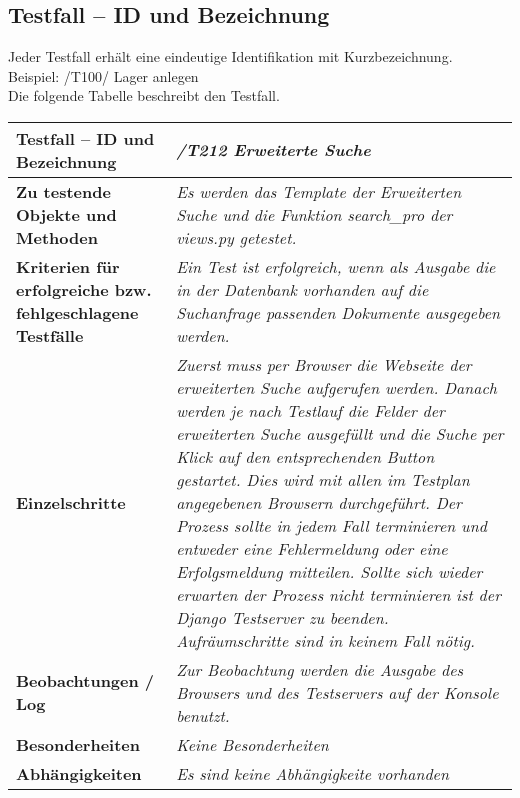 \subsection{Testfall -- ID und Bezeichnung}
Jeder Testfall erh\"alt eine eindeutige Identifikation mit Kurzbezeichnung.\\
Beispiel: /T100/ Lager anlegen\\
Die folgende Tabelle beschreibt den Testfall. \\
\begin{longtable}{|p{5cm}|p{10cm}|}
\hline
\textbf{Testfall -- ID und Bezeichnung} &  \textit{/T212 Erweiterte Suche} \\
\hline
\textbf{Zu testende Objekte und Methoden} &  \textit{Es werden das Template der
Erweiterten Suche und die Funktion search\_pro der views.py getestet.}
\\
\hline
\textbf{Kriterien f\"ur erfolgreiche bzw. fehlgeschlagene Testf\"alle} &
\textit{Ein Test ist erfolgreich, wenn als Ausgabe die in der Datenbank
vorhanden auf die Suchanfrage passenden Dokumente ausgegeben werden.} \\
\hline
\textbf{Einzelschritte} &  \textit{Zuerst muss per Browser die Webseite  
der erweiterten Suche aufgerufen werden. Danach werden je nach Testlauf die 
Felder der erweiterten Suche ausgefüllt und die Suche per Klick auf den 
entsprechenden Button gestartet. Dies wird mit allen im Testplan angegebenen
Browsern durchgeführt. Der Prozess sollte in jedem Fall terminieren und entweder
eine Fehlermeldung oder eine Erfolgsmeldung mitteilen. Sollte sich wieder
erwarten der Prozess nicht terminieren ist der Django Testserver zu beenden.
Aufräumschritte sind in keinem Fall nötig.} \\
\hline
\textbf{Beobachtungen / Log} &  \textit{Zur Beobachtung werden die Ausgabe des
Browsers und des Testservers auf der Konsole benutzt.}\\
\hline
\textbf{Besonderheiten } &  \textit{Keine Besonderheiten} \\
\hline
\textbf{Abh\"angigkeiten} &  \textit{Es sind keine Abhängigkeite vorhanden} \\
\hline

 \end{longtable}



